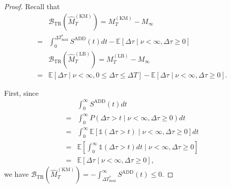 \documentclass[10pt,a4paper]{amsart}
\def\mbe{\mathbb{E}}
\def\mbone{\mathds{1}}
\def\nn{\nonumber \\ }
\begin{document}
\begin{proof}
    Recall that 
    \begin{align}
        &\mathcal{B}_\mathrm{TR}(\hat{M}_T^\mathrm{(KM)}) =  M_T^{\mathrm{(KM)}} - M_\infty \nn
        =& \int_0^{\Delta T_\mathrm{max}^*} S^\mathrm{ADD}(t) dt
        - \mbe[\Delta\tau \mid \nu < \infty, \Delta \tau \geq 0] \\
        &\mathcal{B}_\mathrm{TR}(\hat{M}_T^\mathrm{(LB)}) =  M_T^{\mathrm{(LB)}} - M_\infty \nn
        =& \mbe[\Delta\tau \mid \nu < \infty,0 \leq \Delta \tau \leq \Delta T]
        - \mbe[\Delta\tau \mid \nu < \infty,  \Delta \tau \geq 0].
    \end{align}
    
    First, since 
    \begin{align}
        &\int_0^\infty S^\mathrm{ADD}(t)  dt \\
        =& \int_0^\infty P(\Delta \tau > t \mid \nu < \infty, \Delta \tau \geq 0) dt \\
        =& \int_0^\infty  \mbe[\mbone(\Delta \tau > t) \mid \nu < \infty, \Delta \tau \geq 0] dt \\
        =& \mbe[\int_0^\infty \mbone(\Delta\tau > t) dt \mid \nu < \infty, \Delta \tau \geq 0] \\
        =& \mbe[\Delta \tau \mid \nu < \infty, \Delta \tau \geq 0]  ,
    \end{align}
    we have 
    $\mathcal{B}_\mathrm{TR}(\hat{M}_T^\mathrm{(KM)}) = - \int_{\Delta T_\mathrm{max}^*}^\infty S^\mathrm{ADD}(t) \leq 0$.    


\end{proof}
\end{document}
